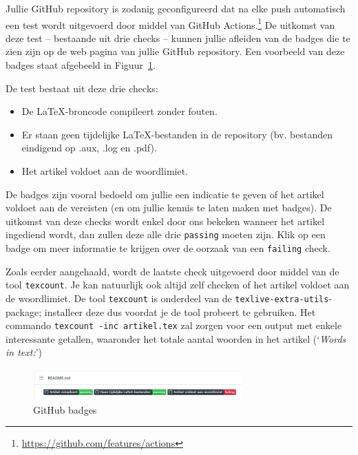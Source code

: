 \documentclass[a4paper]{article}
\begin{document}
Jullie GitHub repository is zodanig geconfigureerd dat na elke push automatisch een test wordt uitgevoerd door middel van GitHub Actions.\footnote{\url{https://github.com/features/actions}}
De uitkomst van deze test -- bestaande uit drie checks -- kunnen jullie afleiden van de badges die te zien zijn op de web pagina van jullie GitHub repository.
Een voorbeeld van deze badges staat afgebeeld in Figuur~\ref{fig:badges}.

De test bestaat uit deze drie checks:

\begin{itemize}
	\item De \LaTeX{}-broncode compileert zonder fouten.
	\item Er staan geen tijdelijke \LaTeX{}-bestanden in de repository (bv. bestanden eindigend op .aux, .log en .pdf).
	\item Het artikel voldoet aan de woordlimiet.
\end{itemize}

De badges zijn vooral bedoeld om jullie een indicatie te geven of het artikel voldoet aan de vereisten (en om jullie kennis te laten maken met badges).
De uitkomst van deze checks wordt enkel door ons bekeken wanneer het artikel ingediend wordt, dan zullen deze alle drie \texttt{passing} moeten zijn.
Klik op een badge om meer informatie te krijgen over de oorzaak van een \texttt{failing} check.

Zoals eerder aangehaald, wordt de laatste check uitgevoerd door middel van de tool \texttt{texcount}.
Je kan natuurlijk ook altijd zelf checken of het artikel voldoet aan de woordlimiet.
De tool \texttt{texcount} is onderdeel van de \texttt{texlive-extra-utils}-package; installeer deze dus voordat je de tool probeert te gebruiken.
Het commando \texttt{texcount -inc artikel.tex} zal zorgen voor een output met enkele interessante getallen, waaronder het totale aantal woorden in het artikel (`\textit{Words in text:}')

\begin{figure}[h]
	\centering
	\includegraphics[width=8cm]{figures/iw-badges-voorbeeld.png}
	\caption{GitHub badges}
	\label{fig:badges}
\end{figure}


\end{document}
